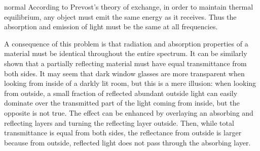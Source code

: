 \begin{solution}{normal}
According to Prevost’s theory of exchange, in order to maintain thermal equilibrium, any object must emit the same energy as it receives. Thus the absorption and emission of light must be the same at all frequencies.
\vspace{3mm}

\noindent A consequence of this problem is that radiation and absorption properties of a material must be identical throughout the entire spectrum. It can be similarly shown that a partially reflecting material must have equal transmittance from both sides. It may seem that dark window glasses are more transparent when looking from inside of a darkly lit room, but this is a mere illusion: when looking from outside, a small fraction of reflected abundant outside light can easily dominate over the transmitted part of the light coming from inside, but the opposite is not true. The effect can be enhanced by overlaying an absorbing and reflecting layers and turning the reflecting layer outside. Then, while total transmittance is equal from both sides, the reflectance from outside is larger because from outside, reflected light does not pass through the absorbing layer.
\end{solution}